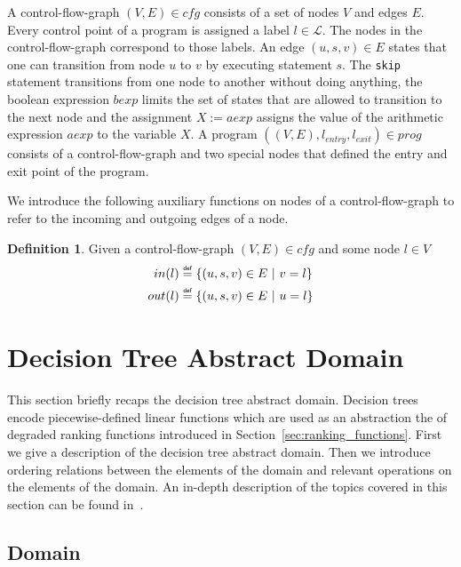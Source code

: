 \documentclass[11pt,a4paper,titlepage]{article}
\theoremstyle{definition}
\newtheorem{definition}{Definition}[section]
\newcommand\eqdef{\mathrel{\overset{\makebox[0pt]{\mbox{\normalfont\tiny\sffamily def}}}{=}}}
\begin{document}
A control-flow-graph $(V, E) \in cfg$ consists of a set of nodes $V$ and edges $E$.
Every control point of a program is assigned a label $l \in \mathcal{L}$. 
The nodes in the control-flow-graph correspond to those labels. 
An edge $(u, s, v) \in E$ states that one can transition from node
$u$ to $v$ by executing statement $s$. 
The \texttt{skip} statement transitions from one node to another without doing anything, 
the boolean expression $bexp$ limits the set of states
that are allowed to transition to the next node and the assignment $X := aexp$ assigns the value of the arithmetic expression $aexp$
to the variable $X$. A program $((V, E), l_{entry}, l_{exit}) \in prog$ consists of a control-flow-graph and two special 
nodes that defined the entry and exit point of the program.

We introduce the following auxiliary functions on nodes of a control-flow-graph to 
refer to the incoming and outgoing edges of a node.

\begin{definition}\label{def:cfg_in}
    Given a control-flow-graph $(V, E) \in cfg$ and some node $l \in V$
    \begin{align*}
        in(l) &\eqdef \{(u, s, v) \in E \ | \ v = l \}\\
        out(l) &\eqdef \{(u, s, v) \in E \ | \ u = l \}\\
    \end{align*}
\end{definition}


\section{Decision Tree Abstract Domain}\label{sec:decision_tree_abstract_domain}

This section briefly recaps the decision tree abstract domain. 
Decision trees encode piecewise-defined linear functions which are used as an abstraction 
the of degraded ranking functions introduced in Section~\ref{sec:ranking_functions}. 
First we give a description of the decision tree abstract domain. 
Then we introduce ordering relations between the elements of the domain and relevant operations on the elements of the domain. 
An in-depth description of the topics covered in this section can be found in~\cite{UrbanPhd}.\\

\subsection{Domain}
\end{document}
